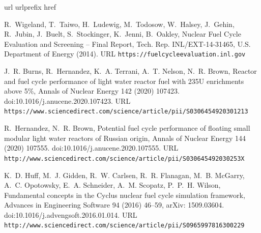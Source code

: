 \documentclass[preprint]{elsarticle}
\begin{document}
\begin{thebibliography}{10}
\expandafter\ifx\csname url\endcsname\relax
  \def\url#1{\texttt{#1}}\fi
\expandafter\ifx\csname urlprefix\endcsname\relax\def\urlprefix{URL }\fi
\expandafter\ifx\csname href\endcsname\relax
  \def\href#1#2{#2} \def\path#1{#1}\fi

R.~Wigeland, T.~Taiwo, H.~Ludewig, M.~Todosow, W.~Halsey, J.~Gehin, R.~Jubin,
  J.~Buelt, S.~Stockinger, K.~Jenni, B.~Oakley,
  \href{https://fuelcycleevaluation.inl.gov}{Nuclear {Fuel} {Cycle}
  {Evaluation} and {Screening} -- {Final} {Report}}, Tech. Rep.
  INL/EXT-14-31465, U.S. Department of Energy (2014).
\newline\urlprefix\url{https://fuelcycleevaluation.inl.gov}

J.~R. Burns, R.~Hernandez, K.~A. Terrani, A.~T. Nelson, N.~R. Brown,
  \href{https://www.sciencedirect.com/science/article/pii/S0306454920301213}{Reactor
  and fuel cycle performance of light water reactor fuel with {235U}
  enrichments above 5\%}, Annals of Nuclear Energy 142 (2020) 107423.
\newblock \href {http://dx.doi.org/10.1016/j.anucene.2020.107423}
  {\path{doi:10.1016/j.anucene.2020.107423}}.
\newline\urlprefix\url{https://www.sciencedirect.com/science/article/pii/S0306454920301213}

R.~Hernandez, N.~R. Brown,
  \href{http://www.sciencedirect.com/science/article/pii/S030645492030253X}{Potential
  fuel cycle performance of floating small modular light water reactors of
  {Russian} origin}, Annals of Nuclear Energy 144 (2020) 107555.
\newblock \href {http://dx.doi.org/10.1016/j.anucene.2020.107555}
  {\path{doi:10.1016/j.anucene.2020.107555}}.
\newline\urlprefix\url{http://www.sciencedirect.com/science/article/pii/S030645492030253X}

K.~D. Huff, M.~J. Gidden, R.~W. Carlsen, R.~R. Flanagan, M.~B. McGarry, A.~C.
  Opotowsky, E.~A. Schneider, A.~M. Scopatz, P.~P.~H. Wilson,
  \href{http://www.sciencedirect.com/science/article/pii/S0965997816300229}{Fundamental
  concepts in the {Cyclus} nuclear fuel cycle simulation framework}, Advances
  in Engineering Software 94 (2016) 46--59, arXiv: 1509.03604.
\newblock \href {http://dx.doi.org/10.1016/j.advengsoft.2016.01.014}
  {\path{doi:10.1016/j.advengsoft.2016.01.014}}.
\newline\urlprefix\url{http://www.sciencedirect.com/science/article/pii/S0965997816300229}


\end{thebibliography}
\end{document}
